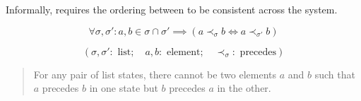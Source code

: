 
\begin{frame}{}
  \centerline{\Huge {}}
\end{frame}

\begin{frame}{}
  \begin{definition}
    Informally, \wlspec{} requires the ordering between  to be consistent across the system.
  \end{definition}

  \pause
  \vspace{1.00cm}
  \centerline{}
  \[
    \forall \sigma, \sigma': a, b \in \sigma \cap \sigma' \implies (a \prec_{\sigma} b \iff a \prec_{\sigma'} b)
  \]

  \[
    (\sigma, \sigma': \text{ list}; \quad a, b: \text{ element}; \quad \prec_{\sigma}: \text{ precedes})
  \]

  \begin{quote}
    For any pair of list states, there cannot be two elements $a$ and $b$ such that $a$ precedes $b$ in one state
    but $b$ precedes $a$ in the other.
  \end{quote}
\end{frame}

\begin{frame}{}
  \begin{columns}
      \vspace{-0.60cm}
      \vspace{-0.60cm}
  \end{columns}
\end{frame}
